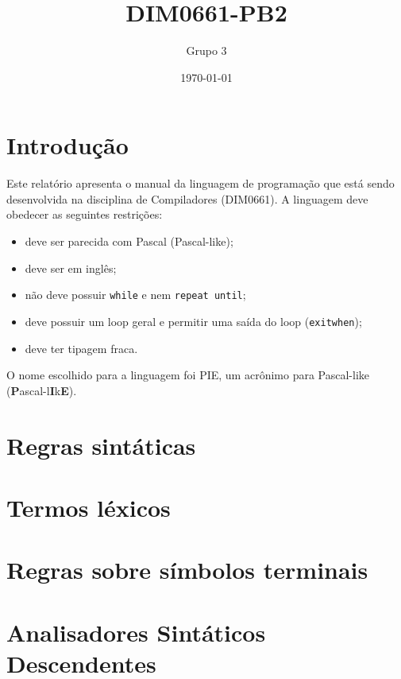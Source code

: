 \documentclass[12pt]{report}
\title{DIM0661-PB2}
\author{Grupo 3}
\date{\today}
\begin{document}
\maketitle

\tableofcontents

\chapter{Introdução}
Este relatório apresenta o manual da linguagem de programação que está sendo desenvolvida na disciplina de Compiladores (DIM0661). A linguagem deve obedecer as seguintes restrições:

\begin{changemargin}{1cm}{1cm}
\begin{itemize}
    \item deve ser parecida com Pascal (Pascal-like);
    \item deve ser em inglês;
    \item não deve possuir \texttt{while} e nem \texttt{repeat until};
    \item deve possuir um loop geral e permitir uma saída do loop (\texttt{exitwhen});
    \item deve ter tipagem fraca.
\end{itemize}
\end{changemargin}

O nome escolhido para a linguagem foi PIE, um acrônimo para Pascal-like (\textbf{P}ascal-l\textbf{I}k\textbf{E}).

\chapter{Regras sintáticas}


\newpage
\chapter{Termos léxicos}


\newpage
\chapter{Regras sobre símbolos terminais}


\newpage
\chapter{Analisadores Sintáticos Descendentes}

\end{document}
